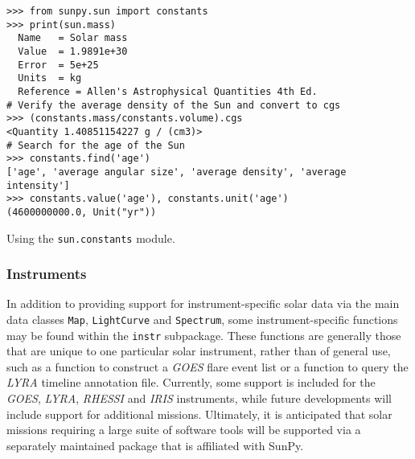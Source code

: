 \begin{listing}[H]
\begin{verbatim}
>>> from sunpy.sun import constants
>>> print(sun.mass)
  Name   = Solar mass
  Value  = 1.9891e+30
  Error  = 5e+25
  Units  = kg
  Reference = Allen's Astrophysical Quantities 4th Ed.
# Verify the average density of the Sun and convert to cgs
>>> (constants.mass/constants.volume).cgs
<Quantity 1.40851154227 g / (cm3)>
# Search for the age of the Sun
>>> constants.find('age')
['age', 'average angular size', 'average density', 'average intensity']
>>> constants.value('age'), constants.unit('age')
(4600000000.0, Unit("yr"))
\end{verbatim}
\caption{Using the \texttt{sun.constants} module.}
\label{code:constants_code}
\end{listing}
	
\subsubsection{Instruments}\label{ssec:util:inst}
In addition to providing support for instrument-specific solar data via the main data 
classes \texttt{Map}, \texttt{LightCurve} and \texttt{Spectrum}, 
some instrument-specific functions may be found within the \texttt{instr} subpackage. 
These functions are generally those that are unique to one particular solar instrument, 
rather than of general use, such as a function to construct a \textit{GOES} flare event list 
or a function to query the \textit{LYRA} timeline annotation file. Currently, some support is included
 for the \textit{GOES}, \textit{LYRA}, \textit{RHESSI} and \textit{IRIS} instruments, while future developments 
 will include support for additional missions. Ultimately, it is anticipated that solar
  missions requiring a large suite of software tools will be supported via a separately 
  maintained package that is affiliated with SunPy.

